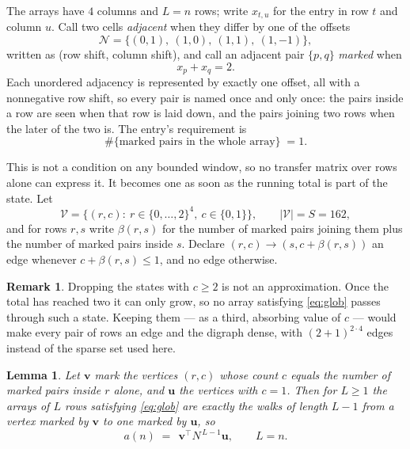 \documentclass[11pt,a4paper]{article}
\theoremstyle{plain}
\newtheorem{lemma}[theorem]{Lemma}
\theoremstyle{definition}
\newtheorem{remark}[theorem]{Remark}
\begin{document}
The arrays have $4$ columns and $L=n$ rows; write $x_{t,u}$ for the entry in
row $t$ and column $u$. Call two cells \emph{adjacent} when they differ by one of the
offsets
\[
\mathcal N=\{(0,1),\ (1,0),\ (1,1),\ (1,-1)\},
\]
written as (row shift, column shift), and call an adjacent pair $\{p,q\}$
\emph{marked} when
\[
x_{p}+x_{q}=2 .
\]
Each unordered adjacency is represented by exactly one offset, all with a nonnegative row
shift, so every pair is named once and only once: the pairs inside a row are seen when
that row is laid down, and the pairs joining two rows when the later of the two is. The
entry's requirement is
\begin{equation}\label{eq:glob}
\#\{\text{marked pairs in the whole array}\}\;=1.
\end{equation}

This is not a condition on any bounded window, so no transfer matrix over rows alone can
express it. It becomes one as soon as the running total is part of the state. Let
\[
\mathcal V=\bigl\{(r,c):\ r\in\{0,\dots,2\}^{4},\ c\in\{0,1\}\bigr\},
\qquad |\mathcal V|=S=162,
\]
and for rows $r,s$ write $\beta(r,s)$ for the number of marked pairs joining them plus the
number of marked pairs inside $s$. Declare $(r,c)\to(s,c+\beta(r,s))$ an edge whenever
$c+\beta(r,s)\le1$, and no edge otherwise.

\begin{remark}
Dropping the states with $c\ge2$ is not an approximation. Once the total has reached two it
can only grow, so no array satisfying \eqref{eq:glob} passes through such a state. Keeping
them --- as a third, absorbing value of $c$ --- would make every pair of rows an edge and
the digraph dense, with $(2+1)^{2\cdot4}$ edges instead of the sparse set used here.
\end{remark}

\begin{lemma}\label{lem:walk}
Let $\mathbf{v}$ mark the vertices $(r,c)$ whose count $c$ equals the number of marked pairs
inside $r$ alone, and $\mathbf{u}$ the vertices with $c=1$. Then for $L\ge1$ the arrays
of $L$ rows satisfying \eqref{eq:glob} are exactly the walks of length $L-1$ from a
vertex marked by $\mathbf{v}$ to one marked by $\mathbf{u}$, so
\[
a(n)\;=\;\,\mathbf{v}^{\!\top}N^{\,L-1}\mathbf{u},\qquad L=n .
\]
\end{lemma}
\end{document}
